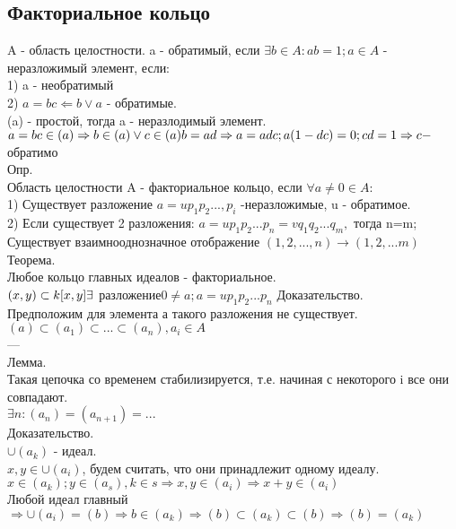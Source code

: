 \documentclass{article}
\begin{document}
\subsection{Факториальное кольцо}
A - область целостности. a - обратимый, если $\exists b \in A: ab=1; a \in A$ - неразложимый элемент, если:\\
1) a - необратимый\\
2) $a=bc \Leftarrow b \vee a$ - обратимые.\\
(a) - простой, тогда a - неразлодимый элемент.\\
$a=bc \in (a) \Rightarrow b \in (a) \vee c \in (a)\\
b = ad \Rightarrow a=adc; a(1-dc)=0; cd = 1 \Rightarrow c - $обратимо\\
Опр.\\
Область целостности A - факториальное кольцо, если $\forall a \neq 0 \in A:$\\
1) Существует разложение $a=up_1p_2..., p_i$  -неразложимые, u - обратимое.\\
2) Если существует 2 разложения: $a=up_1p_2...p_n=vq_1q_2...q_m, $ тогда n=m; Существует взаимнооднозначное отображение $(1,2,...,n)\rightarrow (1,2,...m)$\\
Теорема.\\
Любое кольцо главных идеалов - факториальное.\\
$(x,y) \subset k[x,y]\\
\exists$ разложение$0 \neq a; a=up_1p_2...p_n$
Доказательство.\\
Предположим для элемента а такого разложения не существует.\\
$(a) \subset (a_1) \subset ... \subset (a_n), a_i \in A$\\
---\\
Лемма.\\
Такая цепочка со временем стабилизируется, т.е. начиная с некоторого i все они совпадают.\\
$\exists n: (a_n)=(a_{n+1})=...$\\
Доказательство.\\
$\cup (a_k)$ - идеал.\\
$x,y \in \cup (a_i)$, будем считать, что они принадлежит одному идеалу.\\
$x \in (a_k);y \in (a_s), k\in s \Rightarrow x,y \in (a_i) \Rightarrow x+y \in (a_i)$\\
Любой идеал главный $\Rightarrow \cup (a_i) = (b) \Rightarrow b \in (a_k) \Rightarrow (b) \subset (a_k) \subset (b) \Rightarrow (b)=(a_k)$\\
\end{document}
